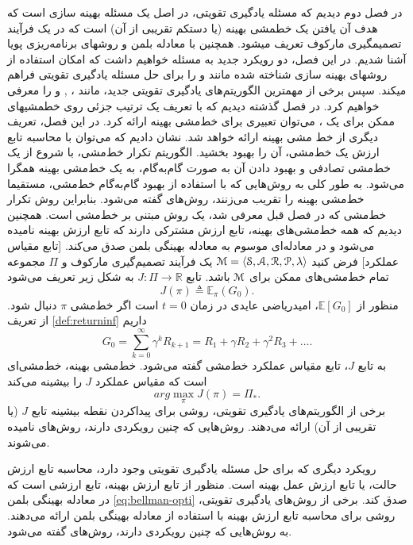 
در فصل دوم دیدیم که مسئله یادگیری تقویتی، در اصل یک مسئله بهینه سازی است که هدف آن یافتن یک خط\nf مشی بهینه (یا دست\nf کم تقریبی از آن) است که در یک فرآیند تصمیم\nf گیری مارکوف تعریف می\nf شود. همچنین  با معادله بلمن و روش\nf های برنامه‌ریزی پویا آشنا شدیم. در این فصل، دو رویکرد جدید به مسئله خواهیم داشت که امکان استفاده از روش\nf های بهینه سازی شناخته شده مانند 
\textit{}
و
\textit{}
را برای حل مسئله یادگیری تقویتی فراهم می\nf کند. سپس برخی از مهم\nf ترین الگوریتم‌های یادگیری تقویتی جدید، مانند
،
,
 و 
  را معرفی خواهیم کرد. 
 در فصل گذشته  دیدیم که با تعریف یک ترتیب جزئی روی خط\nf مشی\nf های ممکن برای یک
،
می‌توان تعبیری برای خط‌مشی بهینه ارائه کرد. در این فصل، تعریف دیگری از خط مشی بهینه ارائه خواهد شد.  نشان دادیم که می‌توان با محاسبه تابع ارزش یک خط‌مشی، آن را بهبود بخشید. الگوریتم تکرار خط‌مشی، با شروع از یک خط‌مشی تصادفی و بهبود دادن آن به صورت گام‌به‌گام، به یک خط‌مشی بهینه همگرا می‌شود.  به طور کلی به روش‌هایی که با استفاده از بهبود گام‌به‌گام خط‌مشی، مستقیما خط‌مشی بهینه  را تقریب می‌زنند، روش‌های 
\textit{}
گفته می‌شود. بنابراین روش تکرار خط‌مشی که در فصل قبل معرفی شد، یک روش مبتنی بر خط‌مشی است.
 همچنین دیدیم که همه خط‌مشی‌های بهینه، تابع ارزش مشترکی دارند که تابع ارزش بهینه نامیده  می‌شود و در معادله‌ای موسوم به معادله بهینگی بلمن صدق می‌کند.
[تابع مقیاس عملکرد] فرض کنید 
$\EuScript{M} = \left< \EuScript{S},\EuScript{A},\EuScript{R},\EuScript{P}, \lambda \right>$ 
یک فرآیند تصمیم‌گیری مارکوف و $\Pi$ مجموعه تمام خط‌مشی‌های ممکن برای $\EuScript{M}$ باشد. تابع 
$J: \Pi \to \mathbb{R}$
به شکل زیر تعریف می‌شود
$$J(\pi) \triangleq \mathbb{E}_\pi(G_0).$$
منظور از 
$\mathbb{E}[G_0]$،
امیدریاضی عایدی در زمان 
$t=0$
است اگر خط‌مشی $\pi$ دنبال شود. از تعریف 
\ref{def:returninf}
داریم
$$G_0 = \sum_{k=0}^{\infty} \gamma^{k} R_{k+1} = R_1 + \gamma R_2 + \gamma^2 R_3 + \dots .$$
به تابع $J$، تابع مقیاس عملکرد خط‌مشی گفته می‌شود.
خط‌مشی بهینه، خط‌مشی‌ای است که مقیاس عملکرد $J$ را بیشینه می‌کند
$$arg \max_{\pi} J(\pi) = \Pi_*.$$
برخی از الگوریتم‌های یادگیری تقویتی، روشی برای پیداکردن نقطه بیشینه تابع $J$ (یا تقریبی از آن) ارائه می‌دهند. روش‌هایی که چنین رویکردی دارند، روش‌های 
\textit{}
 نامیده می‌شوند.
 
 رویکرد دیگری که برای حل مسئله یادگیری تقویتی وجود دارد، محاسبه تابع ارزش حالت، یا تابع ارزش عمل بهینه است. منظور از تابع ارزش بهینه، تابع ارزشی است که در معادله بهینگی بلمن 
 \ref{eq:bellman-opti}
 صدق کند. برخی از روش‌های یادگیری تقویتی، روشی برای محاسبه تابع ارزش بهینه با استفاده از معادله بهینگی بلمن ارائه می‌دهند. به روش‌هایی که چنین رویکردی دارند، روش‌های 
 \textit{
 	}
 گفته می‌شود.


